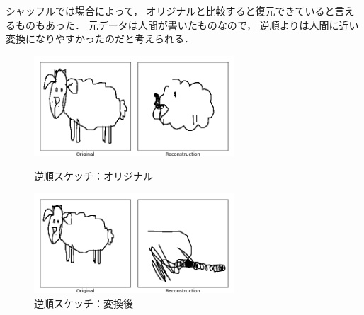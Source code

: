 \documentclass[twocolumn]{jarticle}     %
\begin{document}
シャッフルでは場合によって，
オリジナルと比較すると復元できていると言えるものもあった．
元データは人間が書いたものなので，
逆順よりは人間に近い変換になりやすかったのだと考えられる．

\begin{figure}[tb]
 \begin{minipage}{0.5\hsize}
 	\begin{center}
 		\includegraphics[clip,width=75mm]{sketch_tra_reverse_org_0.png}
 		\caption{逆順スケッチ：オリジナル}
 		\label{fig:short}
 	\end{center}
 \end{minipage}
 \begin{minipage}{0.5\hsize}
 	\begin{center}
    \includegraphics[clip,width=75mm]{sketch_tra_reverse_rvr_0.png}
    \caption{逆順スケッチ：変換後}
    \label{fig:param}
 	\end{center}
 \end{minipage}
\end{figure}
\end{document}
